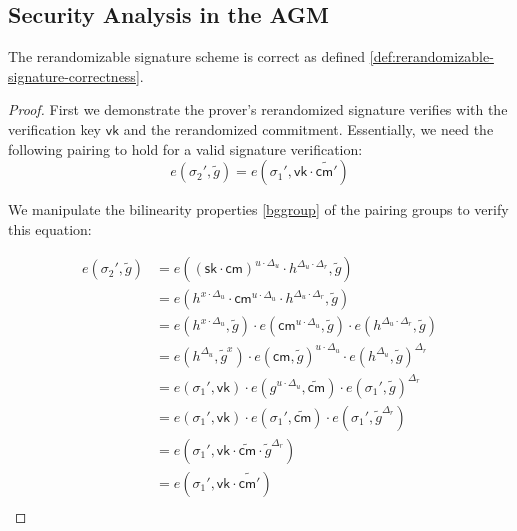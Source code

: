 \subsection{Security Analysis in the AGM}

\begin{theorem}
The rerandomizable signature scheme is correct as defined \ref{def:rerandomizable-signature-correctness}.
\end{theorem}


\begin{proof}
First we demonstrate the prover's rerandomized signature verifies with the verification key $\mathsf{vk}$ and the rerandomized commitment. Essentially, we need the following pairing to hold for a valid signature verification:
\[
    e(\sigma_2', \tilde{g}) = e(\sigma_1', \mathsf{vk} \cdot \widetilde{\mathsf{cm}'})
\]

We manipulate the bilinearity properties \ref{bggroup} of the pairing groups to verify this equation:
    
\begin{align*}
    e(\sigma_2', \tilde{g}) &= e((\mathsf{sk} \cdot \mathsf{cm})^{u \cdot \Delta_u} \cdot h^{\Delta_u \cdot \Delta_r}, \tilde{g}) \\
    &= e(h^{x \cdot \Delta_u} \cdot \mathsf{cm}^{u \cdot \Delta_u} \cdot h^{\Delta_u \cdot \Delta_r}, \tilde{g}) \\
    &= e(h^{x \cdot \Delta_u}, \tilde{g}) \cdot e(\mathsf{cm}^{u \cdot \Delta_u}, \tilde{g}) \cdot e(h^{\Delta_u \cdot \Delta_r}, \tilde{g}) \\
    &= e(h^{\Delta_u}, \tilde{g}^x) \cdot e(\mathsf{cm}, \tilde{g})^{u \cdot \Delta_u} \cdot e(h^{\Delta_u}, \tilde{g})^{\Delta_r} \\
    &= e(\sigma_1', \mathsf{vk}) \cdot e(g^{u \cdot \Delta_u}, \widetilde{\mathsf{cm}}) \cdot e(\sigma_1', \tilde{g})^{\Delta_r} \\
    &= e(\sigma_1', \mathsf{vk}) \cdot e(\sigma_1', \widetilde{\mathsf{cm}}) \cdot e(\sigma_1', \tilde{g}^{\Delta_r}) \\
    &= e(\sigma_1', \mathsf{vk} \cdot \widetilde{\mathsf{cm}} \cdot \tilde{g}^{\Delta_r}) \\
    &= e(\sigma_1', \mathsf{vk} \cdot \widetilde{\mathsf{cm}'}) \\
\end{align*}
\end{proof}

